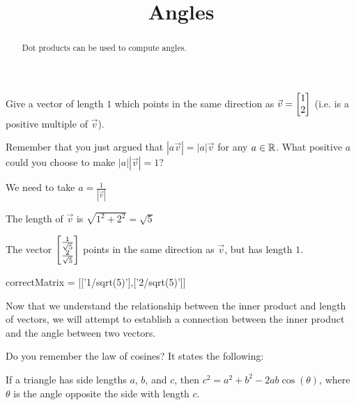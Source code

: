 \documentclass{ximera}
\title{Angles}
\begin{document}
\begin{abstract}
  Dot products can be used to compute angles.
\end{abstract}

\maketitle

\begin{question}
  Give a vector of length $1$ which points in the same direction as $\vec{v} = \begin{bmatrix}1\\2\end{bmatrix}$ (i.e. is a positive multiple of $\vec{v}$). 
  \begin{solution}
    
    \begin{hint}
      Remember that you just argued that $|a\vec{v}| =|a|\vec{v}$ for any $a\in \mathbb R$.  What positive $a$ could you choose to make $|a||\vec{v}| = 1$?
    \end{hint}
    \begin{hint}
      We need to take $a = \frac{1}{|\vec{v}|}$
    \end{hint}
    \begin{hint}
      The length of $\vec{v}$ is $\sqrt{1^2+2^2} = \sqrt{5}$
    \end{hint}
    \begin{hint}
      The vector $\begin{bmatrix}\frac{1}{\sqrt{5}}\\\frac{2}{\sqrt{5}}\end{bmatrix}$ points in the same direction as $\vec{v}$, but has length $1$.
    \end{hint}
    \begin{matrix-answer}
      correctMatrix = [['1/sqrt(5)'],['2/sqrt(5)']]
    \end{matrix-answer}
  \end{solution}
\end{question}	

Now that we understand the relationship between the inner product and
length of vectors, we will attempt to establish a connection between
the inner product and the angle between two vectors.

Do you remember the law of cosines?  It states the following:

\begin{theorem}
  If a triangle has side lengths $a$, $b$, and $c$, then $c^2 = a^2+b^2 - 2ab\cos(\theta)$, where $\theta$ is the angle opposite the side with length $c$.
\end{theorem}
\end{document}
